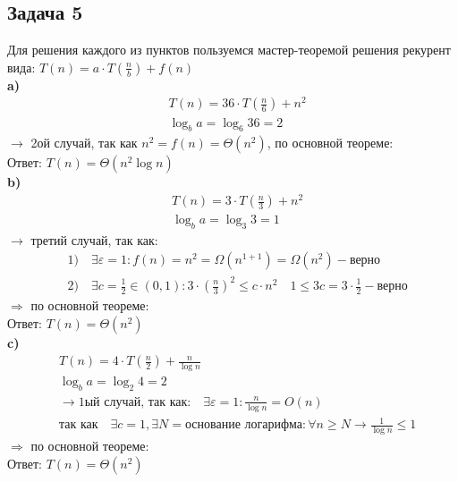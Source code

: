 \documentclass[a4paper,12pt]{article} %
\begin{document}
\subsection*{Задача 5}
Для решения каждого из пунктов пользуемся мастер-теоремой решения рекурент вида: $T(n)=a \cdot T\left(\frac{n}{b}\right)+f(n)$\\
{\bf a)} 
$$
\begin{aligned}
&T(n)=36 \cdot T\left(\frac{n}{6}\right)+n^{2}\\
&\log _{b} a=\log _{6} 36=2
\end{aligned}
$$
$ \longrightarrow $ 2ой случай, так как $ n^2 = f(n) = \Theta(n^2) $, по основной теореме:\\
Ответ: $ T(n) = \Theta(n^2 \log n) $\\
{\bf b)}
$$
\begin{aligned}
&T(n)=3 \cdot T\left(\frac{n}{3}\right)+n^{2}\\
&\log _{b} a=\log _{3} 3=1
\end{aligned}
$$
$ \longrightarrow $ третий случай, так как:
$$
\begin{aligned}
&1) \quad \exists \varepsilon=1: f(n)=n^{2}=\Omega\left(n^{1+1}\right)=\Omega\left(n^{2}\right) - \text{верно} \\
&2) \quad \exists c=\frac{1}{2} \in(0,1): 
3 \cdot \left(\frac{n}{3}\right)^{2} \leq c \cdot n^{2} 
\quad 1 \leq 3 c=3 \cdot \frac{1}{2} - \text{верно}
\end{aligned}
$$
$ \Longrightarrow $ по основной теореме:\\
Ответ: $ T(n) = \Theta(n^2) $\\
{\bf c)}
$$
\begin{aligned}
&T(n)=4 \cdot T\left(\frac{n}{2}\right)+\frac{n}{\log n}\\
&\log _{b} a=\log _{2} 4=2\\
&\longrightarrow \text{1ый случай, так как:} \quad \exists \varepsilon=1: \frac{n}{\log n}=O(n) \\
& \text{так как} \quad \exists c = 1, \exists N = \text{основание логарифма} : \forall n \geq N \rightarrow \frac{1}{\log n} \leq 1
\end{aligned}
$$
$ \Longrightarrow $ по основной теореме:\\
Ответ: $ T(n) = \Theta(n^2) $\\
\end{document}
